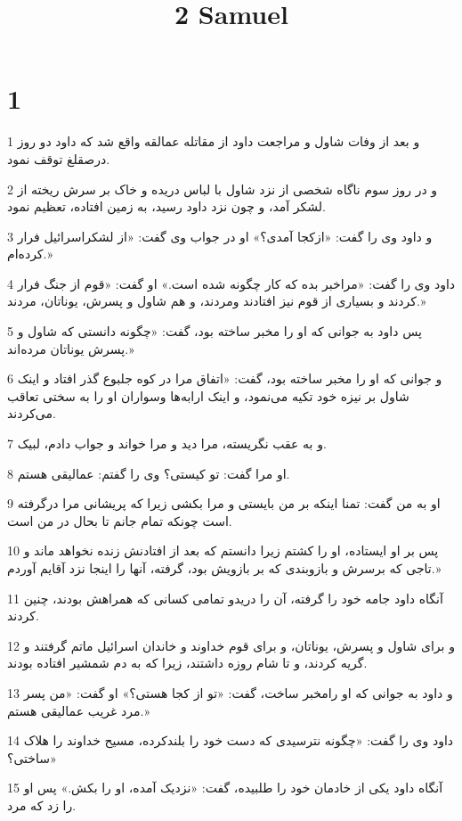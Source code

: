 

\title{2 Samuel}

 
\chapter{1}

\par 1 و بعد از وفات شاول و مراجعت داود از مقاتله عمالقه واقع شد که داود دو روز درصقلغ توقف نمود.
\par 2 و در روز سوم ناگاه شخصی از نزد شاول با لباس دریده و خاک بر سرش ریخته از لشکر آمد، و چون نزد داود رسید، به زمین افتاده، تعظیم نمود.
\par 3 و داود وی را گفت: «ازکجا آمدی؟» او در جواب وی گفت: «از لشکراسرائیل فرار کرده‌ام.»
\par 4 داود وی را گفت: «مراخبر بده که کار چگونه شده است.» او گفت: «قوم از جنگ فرار کردند و بسیاری از قوم نیز افتادند ومردند، و هم شاول و پسرش، یوناتان، مردند.»
\par 5 پس داود به جوانی که او را مخبر ساخته بود، گفت: «چگونه دانستی که شاول و پسرش یوناتان مرده‌اند.»
\par 6 و جوانی که او را مخبر ساخته بود، گفت: «اتفاق مرا در کوه جلبوع گذر افتاد و اینک شاول بر نیزه خود تکیه می‌نمود، و اینک ارابه‌ها وسواران او را به سختی تعاقب می‌کردند.
\par 7 و به عقب نگریسته، مرا دید و مرا خواند و جواب دادم، لبیک.
\par 8 او مرا گفت: تو کیستی؟ وی را گفتم: عمالیقی هستم.
\par 9 او به من گفت: تمنا اینکه بر من بایستی و مرا بکشی زیرا که پریشانی مرا در‌گرفته است چونکه تمام جانم تا بحال در من است.
\par 10 پس بر او ایستاده، او را کشتم زیرا دانستم که بعد از افتادنش زنده نخواهد ماند و تاجی که برسرش و بازوبندی که بر بازویش بود، گرفته، آنها را اینجا نزد آقایم آوردم.»
\par 11 آنگاه داود جامه خود را گرفته، آن را دریدو تمامی کسانی که همراهش بودند، چنین کردند.
\par 12 و برای شاول و پسرش، یوناتان، و برای قوم خداوند و خاندان اسرائیل ماتم گرفتند و گریه کردند، و تا شام روزه داشتند، زیرا که به دم شمشیر افتاده بودند.
\par 13 و داود به جوانی که او رامخبر ساخت، گفت: «تو از کجا هستی؟» او گفت: «من پسر مرد غریب عمالیقی هستم.»
\par 14 داود وی را گفت: «چگونه نترسیدی که دست خود را بلندکرده، مسیح خداوند را هلاک ساختی؟»
\par 15 آنگاه داود یکی از خادمان خود را طلبیده، گفت: «نزدیک آمده، او را بکش.» پس او را زد که مرد.
